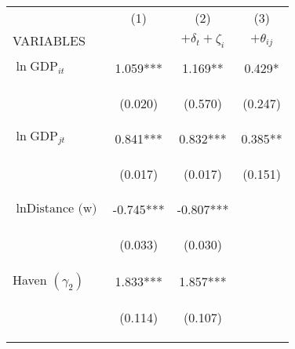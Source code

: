\begin{center}
\begin{tabular}{lccc} \hline
 & (1) & (2) & (3) \\
VARIABLES &  & $+\delta_t+\zeta_i$ & $+\theta_{ij}$ \\ \hline
\vspace{4pt} & \begin{footnotesize}\end{footnotesize} & \begin{footnotesize}\end{footnotesize} & \begin{footnotesize}\end{footnotesize} \\
$\ln\text{GDP}_{it}$ & 1.059*** & 1.169** & 0.429* \\
\vspace{4pt} & \begin{footnotesize}(0.020)\end{footnotesize} & \begin{footnotesize}(0.570)\end{footnotesize} & \begin{footnotesize}(0.247)\end{footnotesize} \\
$\ln\text{GDP}_{jt}$ & 0.841*** & 0.832*** & 0.385** \\
\vspace{4pt} & \begin{footnotesize}(0.017)\end{footnotesize} & \begin{footnotesize}(0.017)\end{footnotesize} & \begin{footnotesize}(0.151)\end{footnotesize} \\
$\ln\text{Distance (w)}$ & -0.745*** & -0.807*** &  \\
\vspace{4pt} & \begin{footnotesize}(0.033)\end{footnotesize} & \begin{footnotesize}(0.030)\end{footnotesize} & \begin{footnotesize}\end{footnotesize} \\
Haven $(\gamma_2)$ & 1.833*** & 1.857*** &  \\
\vspace{4pt} & \begin{footnotesize}(0.114)\end{footnotesize} & \begin{footnotesize}(0.107)\end{footnotesize} & \begin{footnotesize}\end{footnotesize} \\

\end{tabular}
\end{center}
